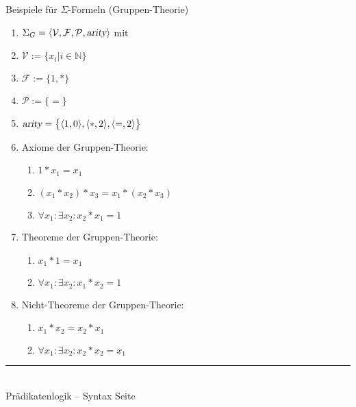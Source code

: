 \documentclass{slides}
\newcommand{\myrule}{\rule{20cm}{1mm}\\ }
\def\pair(#1,#2){\langle #1, #2 \rangle}
\newcounter{mypage}
\begin{document}

\begin{slide}{}
\normalsize
\begin{center}
Beispiele für $\Sigma$-Formeln (Gruppen-Theorie)
\end{center}
\vspace{0.5cm}

\footnotesize
\begin{enumerate}
\item $\Sigma_G = \langle \mathcal{V}, \mathcal{F}, \mathcal{P},\textsl{arity}\rangle$ mit
\item $\mathcal{V} := \{x_i | i \in \mathbb{N} \}$
\item $\mathcal{F} := \{ 1, \mathtt{*} \}$
\item $\mathcal{P} := \{ \mathtt{=} \}$
\item $\textsl{arity} = \bigl\{ \pair(1,0), \pair(\mathtt{*},2), \pair(\mathtt{=},2)\bigr\}$
\item Axiome der Gruppen-Theorie:
  \begin{enumerate}
  \item $1 * x_1 = x_1$
  \item $(x_1 * x_2) * x_3 = x_1 * (x_2 * x_3)$
  \item $\forall x_1: \exists x_2: x_2 * x_1 = 1$
  \end{enumerate}
\item Theoreme der Gruppen-Theorie:
  \begin{enumerate}
  \item $x_1 * 1= x_1$
  \item $\forall x_1: \exists x_2: x_1 * x_2 = 1$
  \end{enumerate}
\item Nicht-Theoreme der Gruppen-Theorie:
  \begin{enumerate}
  \item $x_1 * x_2 = x_2 * x_1$
  \item $\forall x_1: \exists x_2: x_2 * x_2 = x_1$
  \end{enumerate}
\end{enumerate}

\vspace*{\fill}
\tiny \addtocounter{mypage}{1}
\myrule
Prädikatenlogik -- Syntax  \hspace*{\fill} Seite 
\end{slide}

\end{document}
